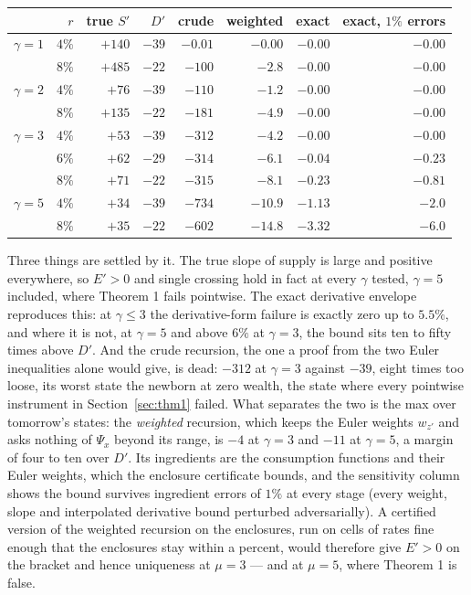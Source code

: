 \begin{center}
\begin{tabular}{lrrrrrrr}
\toprule
& $r$ & true $S'$ & $D'$ & crude & weighted & exact & exact, $1\%$ errors\\
\midrule
$\gamma=1$ & $4\%$ & $+140$ & $-39$ & $-0.01$ & $-0.00$ & $-0.00$ & $-0.00$\\
& $8\%$ & $+485$ & $-22$ & $-100$ & $-2.8$ & $-0.00$ & $-0.00$\\
$\gamma=2$ & $4\%$ & $+76$ & $-39$ & $-110$ & $-1.2$ & $-0.00$ & $-0.00$\\
& $8\%$ & $+135$ & $-22$ & $-181$ & $-4.9$ & $-0.00$ & $-0.00$\\
$\gamma=3$ & $4\%$ & $+53$ & $-39$ & $-312$ & $-4.2$ & $-0.00$ & $-0.00$\\
& $6\%$ & $+62$ & $-29$ & $-314$ & $-6.1$ & $-0.04$ & $-0.23$\\
& $8\%$ & $+71$ & $-22$ & $-315$ & $-8.1$ & $-0.23$ & $-0.81$\\
$\gamma=5$ & $4\%$ & $+34$ & $-39$ & $-734$ & $-10.9$ & $-1.13$ & $-2.0$\\
& $8\%$ & $+35$ & $-22$ & $-602$ & $-14.8$ & $-3.32$ & $-6.0$\\
\bottomrule
\end{tabular}
\end{center}

Three things are settled by it. The true slope of supply is large and positive everywhere, so
$E'>0$ and single crossing hold in fact at every $\gamma$ tested, $\gamma=5$ included, where
Theorem 1 fails pointwise. The exact derivative envelope reproduces this: at $\gamma\le3$ the
derivative-form failure is exactly zero up to $5.5\%$, and where it is not, at $\gamma=5$ and
above $6\%$ at $\gamma=3$, the bound sits ten to fifty times above $D'$. And the crude recursion,
the one a proof from the two Euler inequalities alone would give, is dead: $-312$ at $\gamma=3$
against $-39$, eight times too loose, its worst state the newborn at zero wealth, the state where
every pointwise instrument in Section~\ref{sec:thm1} failed. What separates the two is the max over
tomorrow's states: the \emph{weighted} recursion, which keeps the Euler weights $w_{z'}$ and asks
nothing of $\Psi_x$ beyond its range, is $-4$ at $\gamma=3$ and $-11$ at $\gamma=5$, a margin of
four to ten over $D'$. Its ingredients are the consumption functions and their Euler weights,
which the enclosure certificate bounds, and the sensitivity column shows the bound survives
ingredient errors of $1\%$ at every stage (every weight, slope and interpolated derivative bound
perturbed adversarially). A certified version of the weighted recursion on the enclosures, run on
cells of rates fine enough that the enclosures stay within a percent, would therefore give
$E'>0$ on the bracket and hence uniqueness at $\mu=3$ --- and at $\mu=5$, where Theorem 1 is false.

